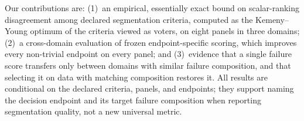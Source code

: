 Our contributions are:
(1)~an empirical, essentially exact bound on scalar-ranking disagreement among
declared segmentation criteria, computed as the Kemeny--Young optimum of the
criteria viewed as voters, on eight panels in three domains;
(2)~a cross-domain evaluation of frozen endpoint-specific scoring, which
improves every non-trivial endpoint on every panel; and
(3)~evidence that a single failure score transfers only between domains with
similar failure composition, and that selecting it on data with matching
composition restores it.
All results are conditional on the declared criteria, panels, and endpoints;
they support naming the decision endpoint and its target failure composition
when reporting segmentation quality, not a new universal metric.
